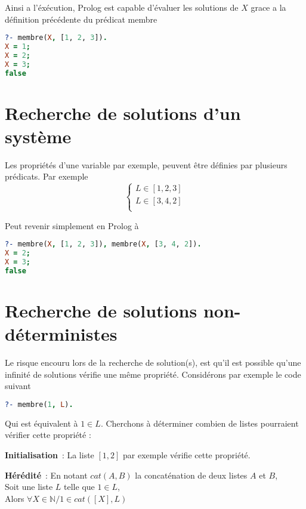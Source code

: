 Ainsi a l'éxécution, Prolog est capable d'évaluer les solutions de $X$ grace a
la définition précédente du prédicat membre

\begin{lstlisting}[language=Prolog,frame=single]
?- membre(X, [1, 2, 3]).
X = 1;
X = 2;
X = 3;
false
\end{lstlisting}


\section{Recherche de solutions d'un système}

Les propriétés d'une variable par exemple, peuvent être définies par plusieurs
prédicats. Par exemple
\[
    \left\{  
    \begin{array}{c}
        L \in [1, 2, 3]\\
        L \in [3, 4, 2]\\
    \end{array}
    \right .
\]

Peut revenir simplement en Prolog à
\begin{lstlisting}[language=Prolog,frame=single]
?- membre(X, [1, 2, 3]), membre(X, [3, 4, 2]).
X = 2;
X = 3;
false
\end{lstlisting}


\section{Recherche de solutions non-déterministes}

Le risque encouru lors de la recherche de solution(s), est qu'il est possible qu'une
infinité de solutions vérifie une même propriété. Considérons par exemple
le code suivant

\begin{lstlisting}[language=Prolog,frame=single]
?- membre(1, L).
\end{lstlisting}

Qui est équivalent à $1 \in L$. Cherchons à déterminer combien de listes
pourraient vérifier cette propriété :

\textbf{Initialisation}~: La liste $[1, 2]$ par exemple vérifie cette propriété.

\textbf{Hérédité}~: En notant $cat(A, B)$ la concaténation de deux listes $A$ et
$B$,\\
Soit une liste $L$ telle que $1 \in L$,\\
Alors $\forall X \in \mathbb{N} / 1 \in cat([X], L)$

